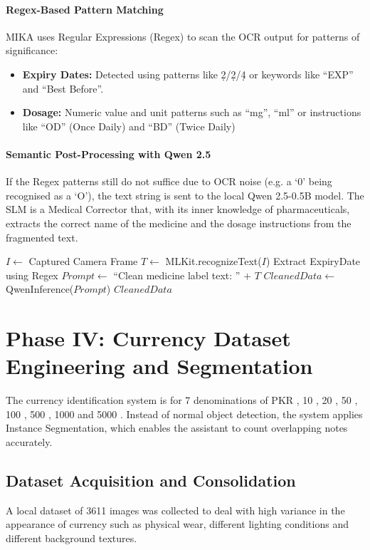 \documentclass[12pt,a4paper]{report}
\begin{document}
\paragraph{Regex-Based Pattern Matching}
MIKA uses Regular Expressions (Regex) to scan the OCR output for patterns of significance: 
\begin{itemize}
    \item \textbf{Expiry Dates:} Detected using patterns like \d2/\d2/\d4 or keywords like “EXP” and “Best Before”.
    \item \textbf{Dosage:} Numeric value and unit patterns such as “mg”, “ml” or instructions like “OD” (Once Daily) and “BD” (Twice Daily)
\end{itemize}
 
\paragraph{Semantic Post-Processing with Qwen 2.5} If the Regex patterns still do not suffice due to OCR noise (e.g. a ‘0’ being recognised as a ‘O’), the text string is sent to the local Qwen 2.5-0.5B model. The SLM is a Medical Corrector that, with its inner knowledge of pharmaceuticals, extracts the correct name of the medicine and the dosage instructions from the fragmented text. 

\begin{algorithm}
\caption{Medicine Information Extraction Logic}
\begin{algorithmic}
\State $I \leftarrow$ Captured Camera Frame
\State $T \leftarrow$ MLKit.recognizeText($I$)
\State Extract ExpiryDate using Regex
\EndIf
\State $Prompt \leftarrow$ ``Clean medicine label text: '' $+ $ $T$
\State $CleanedData \leftarrow$ QwenInference($Prompt$)
\Return $CleanedData$
\end{algorithmic}
\end{algorithm}
 
\section{Phase IV: Currency Dataset Engineering and Segmentation}
The currency identification system is for 7 denominations of PKR , 10 , 20 , 50 , 100 , 500 , 1000 and 5000 . Instead of normal object detection, the system applies Instance Segmentation, which enables the assistant to count overlapping notes accurately.
 
\subsection{Dataset Acquisition and Consolidation}
A local dataset of 3611 images was collected to deal with high variance in the appearance of currency such as physical wear, different lighting conditions and different background textures.
\end{document}
